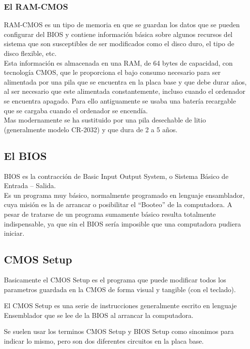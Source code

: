 \documentclass[12pt,oneside,a4paper]{article}
\begin{document}
			\subsubsection{El RAM-CMOS}\label{sub:el ram-cmos}
			RAM-CMOS es un tipo de memoria en que se guardan los datos que se
			pueden configurar del BIOS y contiene información básica sobre algunos
			recursos del sistema que son susceptibles de ser modificados como el
			disco duro, el tipo de disco flexible, etc. \\
			Esta información es almacenada en una RAM, de 64 bytes de capacidad,
			con tecnología CMOS, que le proporciona el bajo consumo necesario para
			ser alimentada por una pila que se encuentra en la placa base y que
			debe durar años, al ser necesario que este alimentada constantemente,
			incluso cuando el ordenador se encuentra apagado. Para ello
			antiguamente se usaba una batería recargable que se cargaba cuando el
			ordenador se encendía. \\
			Mas modernamente se ha sustituido por una pila desechable de litio
			(generalmente modelo CR-2032) y que dura de 2 a 5 años.

		\subsection{El BIOS}{\label{sec:conceptos/BIOS}}

		BIOS es la contracción de Basic Input Output System, o Sistema Básico de
		Entrada – Salida. \\
		Es un programa muy básico, normalmente programado en lenguaje ensamblador,
		cuya misión es la de arrancar o posibilitar el ``Booteo'' de la computadora.
		A pesar de tratarse de un programa sumamente básico resulta totalmente
		indispensable, ya que sin el BIOS sería imposible que una computadora pudiera
		iniciar.

		\subsection{CMOS Setup}\label{sub:cmos setup}
		
		Basicamente el CMOS Setup es el programa que puede modificar todos los parametros
		guardada en la CMOS de forma visual y tangible (con el teclado).

		El CMOS Setup es una serie de instrucciones generalmente escrito en
		lenguaje Ensemblador que se lee de la BIOS al arrancar la computadora.

		Se suelen usar los terminos CMOS Setup y BIOS Setup como sinonimos para indicar lo mismo,
		pero son dos diferentes circuitos en la placa base.
\end{document}
